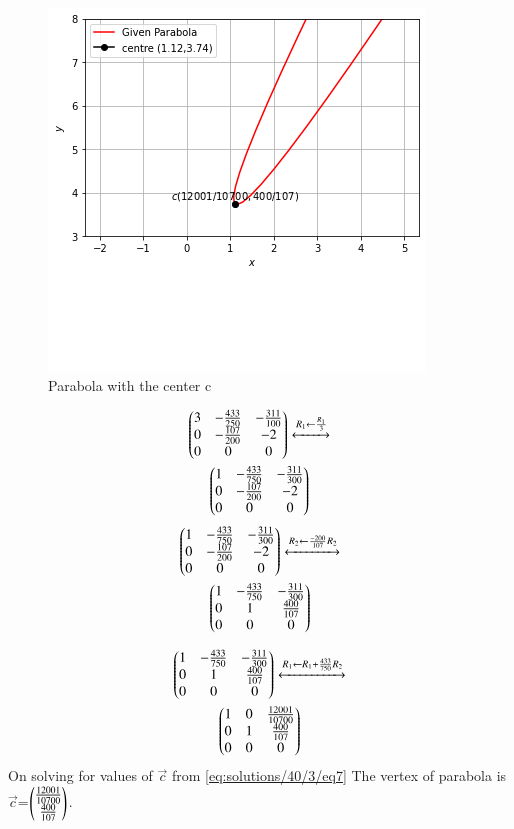 \begin{figure}[!h]
    \centering
    \includegraphics[width=\columnwidth]{./solutions/40/3/parabola.png}
    \caption{Parabola with the center c}
    \label{eq:solutions/40/3/Fig:1}
\end{figure}
\begin{multline}
\begin{pmatrix}3 & -\frac{433}{250}&-\frac{311}{100}\\0 & -\frac{107}{200} & -2\\0& 0&0\end{pmatrix}\xleftrightarrow[]{R_1\leftarrow \frac{R_1}{{3}}}\\\begin{pmatrix}1& -\frac{433}{750}&-\frac{311}{300}\\0 & -\frac{107}{200} & -2\\0& 0&0\end{pmatrix}
\end{multline}
\begin{multline}
\begin{pmatrix}1 & -\frac{433}{750}&-\frac{311}{300}\\0 & -\frac{107}{200} & -2\\0& 0&0\end{pmatrix}\xleftrightarrow[]{R_2\leftarrow \frac{-200}{{107}}R_2}\\
\begin{pmatrix}1 & -\frac{433}{750}&-\frac{311}{300}\\0 & 1 & \frac{400}{107}\\0& 0&0\end{pmatrix}
\end{multline}

\begin{multline}
\begin{pmatrix}1 & -\frac{433}{750}&-\frac{311}{300}\\0 & 1 & \frac{400}{107}\\0& 0&0\end{pmatrix}\xleftrightarrow[]{R_1\leftarrow R_1+\frac{433}{{750}}R_2}\\
\begin{pmatrix}1 & 0&\frac{12001}{10700}\\0 & 1 & \frac{400}{107}\\0& 0&0\end{pmatrix}\label{eq:solutions/40/3/eq7}
\end{multline}
On solving for values of $\vec{c}$ from \eqref{eq:solutions/40/3/eq7} 
 The vertex of parabola is $\vec{c}$=$\begin{pmatrix}\frac{12001}{10700}\\\frac{400}{107}\end{pmatrix}$.
 
